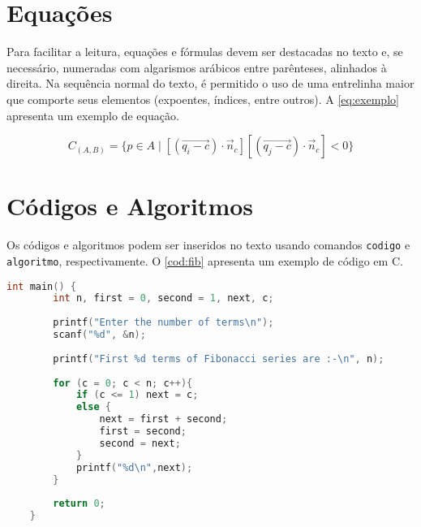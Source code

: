 \documentclass[12pt,oneside,a4paper,chapter=TITLE,section=TITLE,sumario
=tradicional]{abntex2}
\begin{document}
\section{Equações}
\label{sec:equações}

Para facilitar a leitura, equações e fórmulas devem ser destacadas no texto e, 
se necessário, numeradas com algarismos arábicos entre parênteses, alinhados à 
direita. Na sequência normal do texto, é permitido o uso de uma entrelinha 
maior que comporte seus elementos (expoentes, índices, entre outros). A 
\autoref{eq:exemplo} apresenta um exemplo de equação.

\begin{equation}
\label{eq:exemplo}
C_{(A,B)} = \{ p \in
A\;|\;[(\overrightarrow{q_i-c}){\cdot}{\vec{n}}_c][(\overrightarrow{q_j-c})
{\cdot}{\vec{n}}_c]
< 0 \}
\end{equation}

\section{Códigos e Algoritmos}
\label{sec:codigos}

Os códigos e algoritmos podem ser inseridos no texto usando comandos 
\texttt{codigo} e \texttt{algoritmo}, respectivamente. O \autoref{cod:fib} 
apresenta um exemplo de código em C.

\begin{codigo}[htb]
    \begin{lstlisting}[language=C]
    int main() {
        int n, first = 0, second = 1, next, c;
        
        printf("Enter the number of terms\n");
        scanf("%d", &n);
        
        printf("First %d terms of Fibonacci series are :-\n", n);
        
        for (c = 0; c < n; c++){
            if (c <= 1) next = c;
            else {
                next = first + second;
                first = second;
                second = next;
            }
            printf("%d\n",next);
        }
        
        return 0;
    }
    \end{lstlisting}
    
    \fonteautor
\end{codigo}
\end{document}
